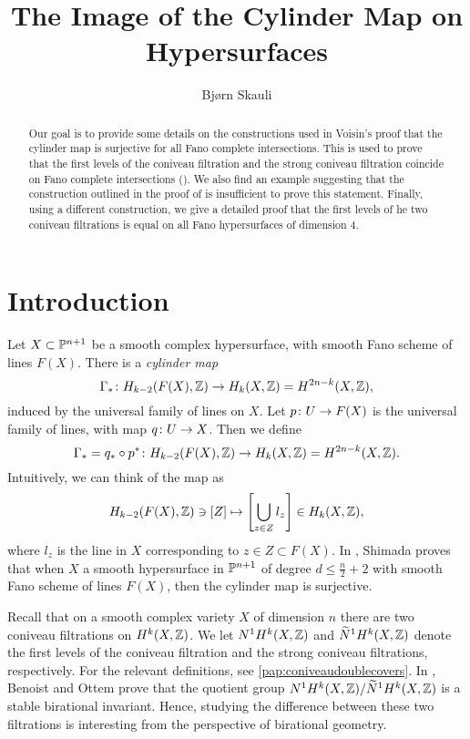 \title{The Image of the Cylinder Map on Hypersurfaces}
\author{Bjørn Skauli}
\date{}

	\maketitle

\label{pap:coniveauhypersurfaces}
        \begin{abstract}
          Our goal is to provide some details on the constructions used in Voisin's proof that the cylinder map is surjective for all Fano complete intersections. This is used to prove that the first levels of the coniveau filtration and the strong coniveau filtration coincide on Fano complete intersections  (\cite[Theorem 1.13]{VoisinConiveauThreefolds}). We also find an example suggesting that the construction outlined in the proof of \cite{VoisinConiveauThreefolds} is insufficient to prove this statement. Finally, using a different construction, we give a detailed proof that the first levels of he two coniveau filtrations is equal on all Fano hypersurfaces of dimension 4.
        \end{abstract}
	
\section{Introduction}
Let $X \subset \P^{n+1}$ be a smooth complex hypersurface, with smooth Fano scheme of lines $F(X)$. There is a \emph{cylinder map} 
\[\Gamma_* \from H_{k-2}(F(X),\Z) \to H_k(X,\Z) = H^{2n-k}(X,\Z), \]
induced by the universal family of lines on $X$. Let $p \from U \to F(X)$ is the universal family of lines, with map $q \from U \to X$. Then we define 
\[ \Gamma_* = q_* \circ p^* \from H_{k-2}(F(X),\Z) \to H_k(X,\Z) = H^{2n-k}(X,\Z).\]
Intuitively, we can think of the map as
\[H_{k-2}(F(X),\Z) \ni [Z] \mapsto \left[\bigcup_{z \in Z} l_z\right] \in H_k(X,\Z), \]
where $l_z$ is the line in $X$ corresponding to $z \in Z \subset F(X)$. In \cite{ShimadaHypersurfaces}, Shimada proves that when $X$ a smooth hypersurface  in $\P^{n+1}$ of degree $d \leq \frac{n}{2}+2$ with smooth Fano scheme of lines $F(X)$, then the cylinder map is surjective.

Recall that on a smooth complex variety $X$ of dimension $n$ there are two coniveau filtrations on $H^k(X,\Z)$. We let $N^1H^k(X,\Z)$ and $\widetilde{N}^1H^k(X,\Z)$ denote the first levels of the coniveau filtration and the strong coniveau filtrations, respectively. For the relevant definitions, see \cref{pap:coniveaudoublecovers}. In \cite[Proposition 2.4]{BenoistOttemConiveau}, Benoist and Ottem prove that the quotient group $N^1H^k(X,\Z) / \widetilde{N}^1H^k(X,\Z)$ is a stable birational invariant. Hence, studying the difference between these two filtrations is interesting from the perspective of birational geometry.

